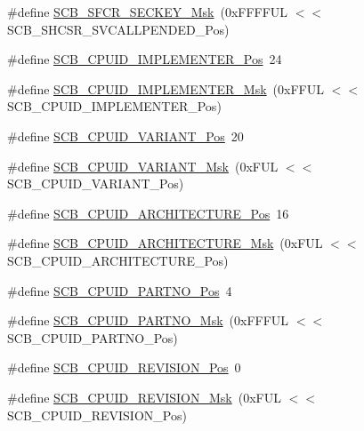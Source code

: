 \begin{DoxyCompactItemize}
\#define \mbox{\hyperlink{group___c_m_s_i_s___s_c_b_ga63204e0b29702db1986965cd501e0261}{S\+C\+B\+\_\+\+S\+F\+C\+R\+\_\+\+S\+E\+C\+K\+E\+Y\+\_\+\+Msk}}~(0x\+F\+F\+F\+F\+U\+L $<$$<$ S\+C\+B\+\_\+\+S\+H\+C\+S\+R\+\_\+\+S\+V\+C\+A\+L\+L\+P\+E\+N\+D\+E\+D\+\_\+\+Pos)
\item 
\#define \mbox{\hyperlink{group___c_m_s_i_s___s_c_b_ga58686b88f94f789d4e6f429fe1ff58cf}{S\+C\+B\+\_\+\+C\+P\+U\+I\+D\+\_\+\+I\+M\+P\+L\+E\+M\+E\+N\+T\+E\+R\+\_\+\+Pos}}~24
\item 
\#define \mbox{\hyperlink{group___c_m_s_i_s___s_c_b_ga0932b31faafd47656a03ced75a31d99b}{S\+C\+B\+\_\+\+C\+P\+U\+I\+D\+\_\+\+I\+M\+P\+L\+E\+M\+E\+N\+T\+E\+R\+\_\+\+Msk}}~(0x\+F\+F\+U\+L $<$$<$ S\+C\+B\+\_\+\+C\+P\+U\+I\+D\+\_\+\+I\+M\+P\+L\+E\+M\+E\+N\+T\+E\+R\+\_\+\+Pos)
\item 
\#define \mbox{\hyperlink{group___c_m_s_i_s___s_c_b_ga104462bd0815391b4044a70bd15d3a71}{S\+C\+B\+\_\+\+C\+P\+U\+I\+D\+\_\+\+V\+A\+R\+I\+A\+N\+T\+\_\+\+Pos}}~20
\item 
\#define \mbox{\hyperlink{group___c_m_s_i_s___s_c_b_gad358dfbd04300afc1824329d128b99e8}{S\+C\+B\+\_\+\+C\+P\+U\+I\+D\+\_\+\+V\+A\+R\+I\+A\+N\+T\+\_\+\+Msk}}~(0x\+F\+U\+L $<$$<$ S\+C\+B\+\_\+\+C\+P\+U\+I\+D\+\_\+\+V\+A\+R\+I\+A\+N\+T\+\_\+\+Pos)
\item 
\#define \mbox{\hyperlink{group___c_m_s_i_s___s_c_b_gaf8b3236b08fb8e840efb682645fb0e98}{S\+C\+B\+\_\+\+C\+P\+U\+I\+D\+\_\+\+A\+R\+C\+H\+I\+T\+E\+C\+T\+U\+R\+E\+\_\+\+Pos}}~16
\item 
\#define \mbox{\hyperlink{group___c_m_s_i_s___s_c_b_gafae4a1f27a927338ae9dc51a0e146213}{S\+C\+B\+\_\+\+C\+P\+U\+I\+D\+\_\+\+A\+R\+C\+H\+I\+T\+E\+C\+T\+U\+R\+E\+\_\+\+Msk}}~(0x\+F\+U\+L $<$$<$ S\+C\+B\+\_\+\+C\+P\+U\+I\+D\+\_\+\+A\+R\+C\+H\+I\+T\+E\+C\+T\+U\+R\+E\+\_\+\+Pos)
\item 
\#define \mbox{\hyperlink{group___c_m_s_i_s___s_c_b_ga705f68eaa9afb042ca2407dc4e4629ac}{S\+C\+B\+\_\+\+C\+P\+U\+I\+D\+\_\+\+P\+A\+R\+T\+N\+O\+\_\+\+Pos}}~4
\item 
\#define \mbox{\hyperlink{group___c_m_s_i_s___s_c_b_ga98e581423ca016680c238c469aba546d}{S\+C\+B\+\_\+\+C\+P\+U\+I\+D\+\_\+\+P\+A\+R\+T\+N\+O\+\_\+\+Msk}}~(0x\+F\+F\+F\+U\+L $<$$<$ S\+C\+B\+\_\+\+C\+P\+U\+I\+D\+\_\+\+P\+A\+R\+T\+N\+O\+\_\+\+Pos)
\item 
\#define \mbox{\hyperlink{group___c_m_s_i_s___s_c_b_ga3c3d9071e574de11fb27ba57034838b1}{S\+C\+B\+\_\+\+C\+P\+U\+I\+D\+\_\+\+R\+E\+V\+I\+S\+I\+O\+N\+\_\+\+Pos}}~0
\item 
\#define \mbox{\hyperlink{group___c_m_s_i_s___s_c_b_ga2ec0448b6483f77e7f5d08b4b81d85df}{S\+C\+B\+\_\+\+C\+P\+U\+I\+D\+\_\+\+R\+E\+V\+I\+S\+I\+O\+N\+\_\+\+Msk}}~(0x\+F\+U\+L $<$$<$ S\+C\+B\+\_\+\+C\+P\+U\+I\+D\+\_\+\+R\+E\+V\+I\+S\+I\+O\+N\+\_\+\+Pos)

\end{DoxyCompactItemize}
